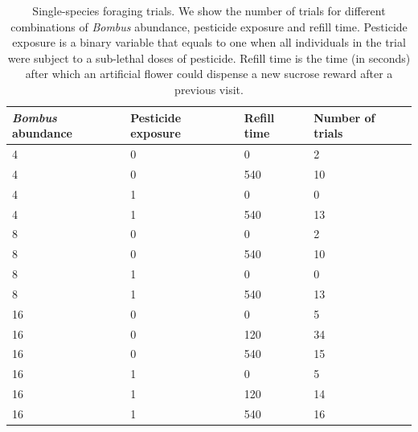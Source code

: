 \begin{refsection}
\begin{table}[H]
\centering
\caption[Single-species foraging trials]{Single-species foraging trials. We show the number of trials for different combinations of \textit{Bombus} abundance, pesticide exposure and refill time. Pesticide exposure is a binary variable that equals to one when all individuals in the trial were subject to a sub-lethal doses of pesticide. Refill time is the time (in seconds) after which an artificial flower could dispense a new sucrose reward after a previous visit. }
\label{tab:si}
\begin{tabular}{@{}llll@{}}
\toprule
\textit{Bombus} abundance & Pesticide exposure & Refill time & Number of trials \\ \midrule
4       & 0                  & 0           & 2                    \\
4       & 0                  & 540         & 10                   \\
4       & 1                  & 0           & 0                    \\
4       & 1                  & 540         & 13                   \\
8       & 0                  & 0           & 2                    \\
8       & 0                  & 540         & 10                   \\
8       & 1                  & 0           & 0                    \\
8       & 1                  & 540         & 13                   \\
16      & 0                  & 0           & 5                    \\
16      & 0                  & 120         & 34                   \\
16      & 0                  & 540         & 15                   \\
16      & 1                  & 0           & 5                    \\
16      & 1                  & 120         & 14                   \\
16      & 1                  & 540         & 16                   \\ \bottomrule
\end{tabular}
\end{table}



\end{refsection}
